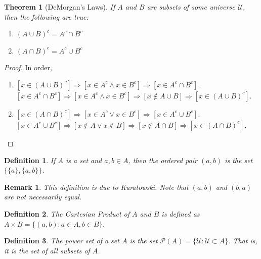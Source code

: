 \documentclass[oneside]{book}
\theoremstyle{mystyle}
\newtheorem{theorem}{Theorem}[section]
\newtheorem{definition}{Definition}[section]
\newtheorem{remark}{Remark}[section]
\begin{document}
\begin{theorem}[DeMorgan's Laws]
If $A$ and $B$ are subsets of some universe $\mathcal{U}$, then the following are true:
\begin{enumerate}
\item $(A\cup B)^c = A^c \cap B^c$
\item $(A\cap B)^c = A^c \cup B^c$
\end{enumerate}
\end{theorem}
\begin{proof}
In order,
\begin{enumerate}
\item $[x\in (A\cup B)^c]\Rightarrow [x\in A^c\land x\in B^c]\Rightarrow [x\in A^c\cap B^c]$. $[x\in A^c \cap B^c]\Rightarrow [x\in A^c\land x\in B^c]\Rightarrow [x\notin A\cup B]\Rightarrow [x\in (A\cup B)^c]$.
\item $[x\in (A\cap B)^c]\Rightarrow [x\in A^c\lor x\in B^c]\Rightarrow [x\in A^c \cup B^c]$. $[x\in A^c \cup B^c]\Rightarrow [x\notin A\lor x\notin B]\Rightarrow [x\notin A\cap B]\Rightarrow [x\in (A\cap B)^c]$.
\end{enumerate}
\end{proof}

\begin{definition}
If $A$ is a set and $a,b\in A$, then the ordered pair $(a,b)$ is the set $\{\{a\},\{a,b\}\}$.
\end{definition}

\begin{remark}
This definition is due to Kuratowski. Note that $(a,b)$ and $(b,a)$ are not necessarily equal.
\end{remark}

\begin{definition}
The Cartesian Product of $A$ and $B$ is defined as $A\times B = \{(a,b):a\in A, b\in B\}$.
\end{definition}

\begin{definition}
The power set of a set $A$ is the set $\mathcal{P}(A) = \{\mathcal{U}:\mathcal{U}\subset A\}$. That is, it is the set of all subsets of $A$.
\end{definition}
%
\end{document}
